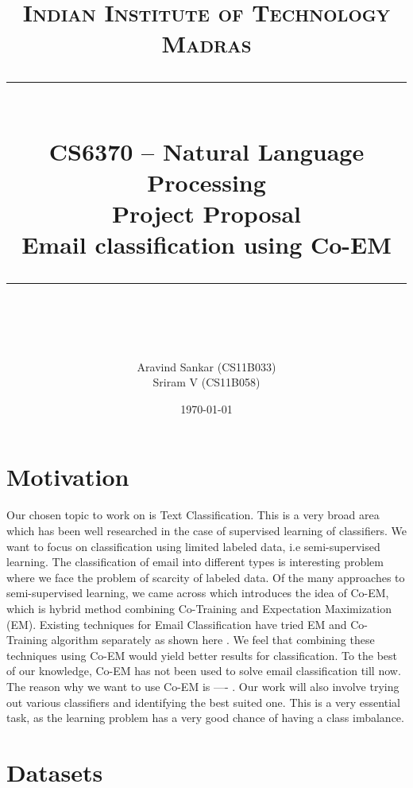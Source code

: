 \newcommand{\horrule}[1]{\rule{\linewidth}{#1}} %

\title{	
\normalfont \normalsize 
\textsc{Indian Institute of Technology Madras} \\ [25pt] %
\horrule{0.5pt} \\[0.4cm] %
\huge CS6370 -- Natural Language Processing \\ Project Proposal \\ Email classification using Co-EM %
\horrule{2pt} \\[0.5cm] %
}
\author{\large Aravind Sankar (CS11B033) \\ \large Sriram V (CS11B058)} %

\date{\normalsize\today} %



\maketitle
\thispagestyle{empty}
\section{Motivation}
Our chosen topic to work on is Text Classification. This is a very broad area which has been well researched in the case of supervised learning of classifiers. We want to focus on classification using limited labeled data, i.e semi-supervised learning. The classification of email into different types is interesting problem where we face the problem of scarcity of labeled data. Of the many approaches to semi-supervised learning, we came across \cite{duck} which introduces the idea of Co-EM, which is hybrid method combining Co-Training and Expectation Maximization (EM). Existing techniques for Email Classification have tried EM and Co-Training algorithm separately as shown here \cite{dog}.  We feel that combining these techniques using Co-EM would yield better results for classification. To the best of our knowledge, Co-EM has not been used to solve email classification till now. The reason why we want to use Co-EM is  ---- . Our work will also involve trying out various classifiers and identifying the best suited one. This is a very essential task, as the learning problem has a very good chance of having a class imbalance.

\section{Datasets}


